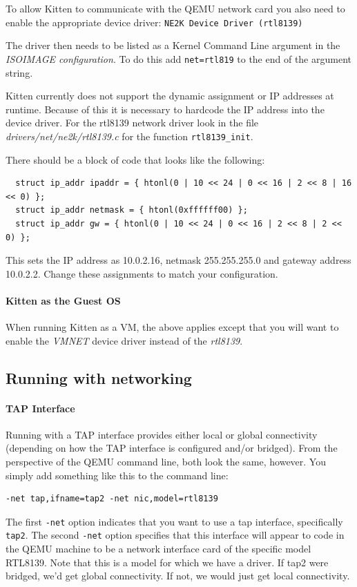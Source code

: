 \documentclass[11pt]{article}
\begin{document}
To allow Kitten to communicate with the QEMU network card you also
need to enable the appropriate device driver: \newline
\verb.NE2K Device Driver (rtl8139).

The driver then needs to be listed as a Kernel Command Line argument
in the {\em ISOIMAGE configuration}. To do this add
\verb.net=rtl819. to the end of the argument string.

Kitten currently does not support the dynamic assignment or IP
addresses at runtime. Because of this it is necessary to hardcode the
IP address into the device driver. For the rtl8139 network driver look
in the file {\em drivers/net/ne2k/rtl8139.c} for the function
\verb.rtl8139_init..

There should be a block of code that looks like the following:
\begin{verbatim}
  struct ip_addr ipaddr = { htonl(0 | 10 << 24 | 0 << 16 | 2 << 8 | 16 << 0) }; 
  struct ip_addr netmask = { htonl(0xffffff00) }; 
  struct ip_addr gw = { htonl(0 | 10 << 24 | 0 << 16 | 2 << 8 | 2 << 0) };
\end{verbatim}

This sets the IP address as 10.0.2.16, netmask 255.255.255.0 and
gateway address 10.0.2.2. Change these assignments to match your configuration.


\paragraph*{Kitten as the Guest OS}

When running Kitten as a VM, the above applies except that you will
want to enable the {\em VMNET} device driver instead of the {\em rtl8139}.


\subsection{Running with networking}

\paragraph*{TAP Interface}
Running with a TAP interface provides either local or global
connectivity (depending on how the TAP interface is configured and/or
bridged).  From the perspective of the QEMU command line, both look
the same, however.  You simply add something like this to the command
line:
\begin{verbatim}
-net tap,ifname=tap2 -net nic,model=rtl8139
\end{verbatim}
The first \verb.-net. option indicates that you want to use a tap
interface, specifically \verb.tap2..   The second \verb.-net. option
specifies that this interface will appear to code in the QEMU machine
to be a network interface card of the specific model RTL8139.  Note
that this is a model for which we have a driver.  If tap2 were
bridged, we'd get global connectivity.  If not, we would just get
local connectivity.  
\end{document}
